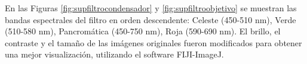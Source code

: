 \documentclass{ctuthesis}
\begin{document}
\begin{figure}[H]
	\begin{floatrow}
	\end{floatrow}


\end{figure}
En las Figuras \ref{fig:supfiltrocondensador} y \ref{fig:supfiltroobjetivo} se muestran las bandas espectrales del filtro en orden descendente: Celeste (450-510 nm), Verde (510-580 nm), Pancromática (450-750 nm), Roja (590-690 nm). El brillo, el contraste y el tamaño de las imágenes originales fueron modificados para obtener una mejor visualización, utilizando el software FIJI-ImageJ. 
\end{document}
